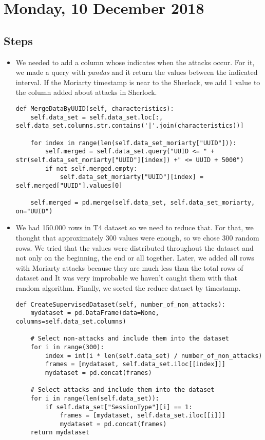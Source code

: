 \section{Monday, 10 December 2018}

\subsection{Steps}
\begin{itemize}
	\item We needed to add a column whose indicates when the attacks occur. For it, we made a query with \textit{pandas} and it return the values between the indicated interval. If the Moriarty timestamp is near to the Sherlock, we add 1 value to the column added about attacks in Sherlock.
	\begin{lstlisting}
def MergeDataByUUID(self, characteristics):
	self.data_set = self.data_set.loc[:, self.data_set.columns.str.contains('|'.join(characteristics))]
	
	for index in range(len(self.data_set_moriarty["UUID"])):
		self.merged = self.data_set.query("UUID <= " + str(self.data_set_moriarty["UUID"][index]) +" <= UUID + 5000")
		if not self.merged.empty:
			self.data_set_moriarty["UUID"][index] = self.merged["UUID"].values[0]
	
	self.merged = pd.merge(self.data_set, self.data_set_moriarty, on="UUID")
	\end{lstlisting}
	\item We had 150.000 rows in T4 dataset so we need to reduce that. For that, we thought that approximately 300 values were enough, so we chose 300 random rows. We tried that the values were distributed throughout the dataset and not only on the beginning, the end or all together. Later, we added all rows with Moriarty attacks because they are much less than the total rows of dataset and It was very improbable we haven't caught them with that random algorithm. Finally, we sorted the reduce dataset by timestamp.
	\begin{lstlisting}
def CreateSupervisedDataset(self, number_of_non_attacks):
	mydataset = pd.DataFrame(data=None, columns=self.data_set.columns)

	# Select non-attacks and include them into the dataset
	for i in range(300):
		index = int(i * len(self.data_set) / number_of_non_attacks)
		frames = [mydataset, self.data_set.iloc[[index]]]
		mydataset = pd.concat(frames)

	# Select attacks and include them into the dataset
	for i in range(len(self.data_set)):
		if self.data_set["SessionType"][i] == 1:
			frames = [mydataset, self.data_set.iloc[[i]]]
			mydataset = pd.concat(frames)
	return mydataset
\end{lstlisting}
	
\end{itemize}

